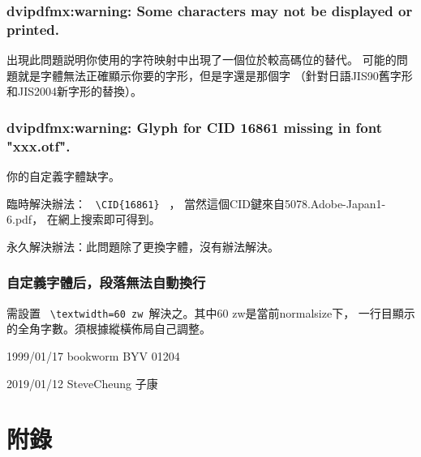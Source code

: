 \documentclass[a4,11pt,uplatex,openleft]{jsarticle}
\begin{document}
\subsubsection{ dvipdfmx:warning: Some characters may not be displayed or printed.}
出現此問題説明你使用的字符映射中出現了一個位於較高碼位的替代。
可能的問題就是字體無法正確顯示你要的字形，但是字還是那個字
（針對日語JIS90舊字形和JIS2004新字形的替換）。


\subsubsection{  dvipdfmx:warning: Glyph for CID 16861 missing in font "xxx.otf". }

\par 你的自定義字體缺字。
\par 臨時解決辦法： \verb+ \CID{16861} + ，
當然這個CID鍵來自5078.Adobe-Japan1-6.pdf，
在網上搜索即可得到。

永久解決辦法：此問題除了更換字體，沒有辦法解決。


\subsubsection{自定義字體后，段落無法自動換行}
需設置 \verb+ \textwidth=60 zw +解決之。其中60 zw是當前normalsize下，
一行目顯示的全角字數。須根據縱橫佈局自己調整。

1999/01/17 bookworm BYV 01204 

2019/01/12  SteveCheung 子康
\clearpage

\section*{附\quad 錄}
\end{document}
